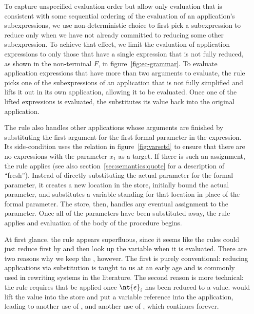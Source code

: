 To capture unspecified evaluation order but allow only evaluation that
is consistent with some sequential ordering of the evaluation of an
application's subexpressions, we use non-deterministic choice to first pick
a subexpression to reduce only when we have not already committed to
reducing some other subexpression. To achieve that effect, we limit
the evaluation of application expressions to only those that have a
single expression that is not fully reduced, as shown in the
non-terminal $F$, in figure~\ref{fig:ec-grammar}. To evaluate
application expressions that have more than two arguments to evaluate,
the rule  picks one of the subexpressions of an
application that is not fully simplified and lifts it out in its own
application, allowing it to be evaluated. Once one of the lifted
expressions is evaluated, the  substitutes its value
back into the original application.

The  rule also handles other applications whose
arguments are finished by substituting the first argument for
the first formal parameter in the expression. Its side-condition uses
the relation in figure~\ref{fig:varsetd} to ensure that there are no
 expressions with the parameter $x_1$ as a target.
If there is such an assignment, the  rule applies (see also section~\ref{sec:semantics:quote} for a description of ``fresh'').
Instead of directly substituting the actual parameter for the formal
parameter, it creates a new location in the store, initially bound the
actual parameter, and substitutes a variable standing for that
location in place of the formal parameter. The store, then, handles
any eventual assignment to the parameter. Once all of the parameters
have been substituted away, the rule  applies and
evaluation of the body of the procedure begins.

At first glance, the rule  appears superfluous, since it seems like the rules could just reduce first by  and then look up the variable when it is evaluated.
There are two reasons why we keep the , however.
The first is purely conventional: reducing applications via substitution is taught to us at an early age and is commonly used in rewriting systems in the literature.
The second reason is more technical:  the
 rule requires that  be applied once $\nt{e}_i$ has been reduced to a value.  would
lift the value into the store and put a variable reference into the application, leading to another use of , and another use of , which continues forever.

